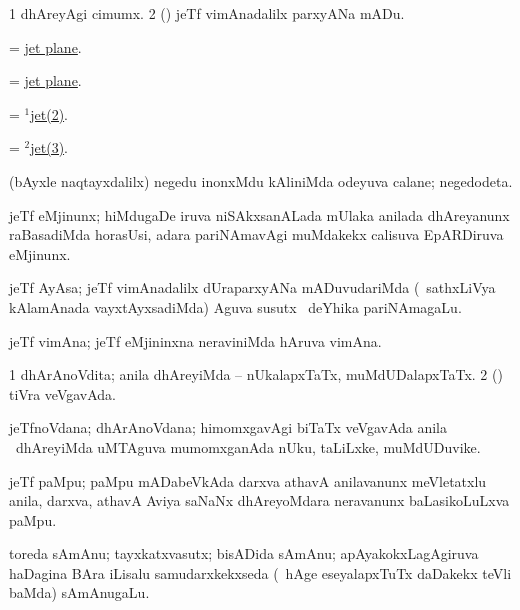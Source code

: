 \noindent
\gl{\akirx}
\bmng
\bnum
\num{1} dhAreyAgi cimumx. 
\num{2} (\AmA) jeTf vimAnadalilx parxyANa mADu. 
\enum
\emng
\eentry

\bentry
{}
\gl{\nA}
\bmng
 = \hyperlink{jet plane}{jet plane}. 
\emng
\eentry

\bentry
{}
\gl{\nA}
\bmng
 = \hyperlink{jet plane}{jet plane}. 
\emng
\eentry

\bentry
{}
\gl{\nA}
\bmng
 = \hyperlink{jet(1)2}{$^1$jet(2)}. 
\emng
\eentry

\bentry
{}
\gl{\gu}
\bmng
 = \hyperlink{jet(2)3}{$^2$jet(3)}. 
\emng
\eentry

\bentry
{}
\gl{\nA}
\bmng
(bAyxle naqtayxdalilx) negedu inonxMdu kAliniMda odeyuva calane; negedodeta. 
\emng
\eentry

\bentry
{}
\gl{\nA}
\bmng
jeTf eMjinunx; hiMdugaDe iruva niSAkxsanALada mUlaka anilada dhAreyanunx raBasadiMda horasUsi, adara pariNAmavAgi muMdakekx calisuva EpARDiruva eMjinunx. 
\emng
\eentry

\bentry
{}
\gl{\nA}
\bmng
jeTf AyAsa; jeTf vimAnadalilx dUraparxyANa mADuvudariMda (\kanmu\ sathxLiVya kAlamAnada vayxtAyxsadiMda) Aguva susutx \mo\ deYhika pariNAmagaLu. 
\emng
\eentry

\bentry
{}
\gl{\nA}
\bmng
jeTf vimAna; jeTf eMjininxna neraviniMda hAruva vimAna. 
\emng
\eentry

\bentry
{}
\gl{\gu}
\bmng
\bnum
\num{1} dhArAnoVdita; anila dhAreyiMda -- nUkalapxTaTx, muMdUDalapxTaTx. 
\num{2} (\rUpa) tiVra veVgavAda. 
\enum
\emng
\eentry

\bentry
{}
\gl{\nA}
\bmng
jeTfnoVdana; dhArAnoVdana; himomxgavAgi biTaTx veVgavAda anila \mo\ dhAreyiMda uMTAguva mumomxganAda nUku, taLiLxke, muMdUDuvike. 
\emng
\eentry

\bentry
{}
\gl{\nA}
\bmng
jeTf paMpu; paMpu mADabeVkAda darxva athavA anilavanunx meVletatxlu anila, darxva, athavA Aviya saNaNx dhAreyoMdara neravanunx baLasikoLuLxva paMpu. 
\emng
\eentry

\bentry
{}
\gl{\nA}
\bmng
toreda sAmAnu; tayxkatxvasutx; bisADida sAmAnu; apAyakokxLagAgiruva haDagina BAra iLisalu samudarxkekxseda (\kanmu\ hAge eseyalapxTuTx daDakekx teVli baMda) sAmAnugaLu. 
\emng
\eentry

